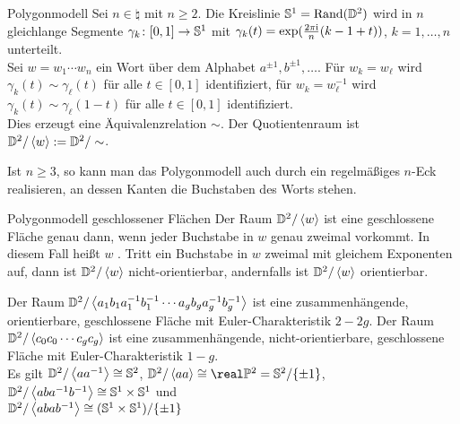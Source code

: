 \linie

\begin{Def}{Polygonmodell}
    Sei $n \in \natural$ mit $n \ge 2$.
    Die Kreislinie $\mathbb{S}^1 = \operatorname{Rand}(\mathbb{D}^2)$ wird in $n$ gleichlange
    Segmente $\gamma_k\colon [0,1] \rightarrow \mathbb{S}^1$ mit
    $\gamma_k(t) = \exp(\frac{2\pi\mathrm{i}}{n} (k - 1 + t))$, $k = 1, \dotsc, n$
    unterteilt. \\
    Sei $w = w_1 \dotsb w_n$ ein Wort über dem Alphabet
    $a^{\pm 1}, b^{\pm 1}, \dotsc$.
    Für $w_k = w_\ell$ wird $\gamma_k(t) \sim \gamma_\ell(t)$ für alle
    $t \in [0, 1]$ identifiziert,
    für $w_k = w_\ell^{-1}$ wird $\gamma_k(t) \sim \gamma_\ell(1 - t)$ für alle
    $t \in [0, 1]$ identifiziert. \\
    Dies erzeugt eine Äquivalenzrelation $\sim$.
    Der Quotientenraum ist
    $\mathbb{D}^2 / \left\langle{w}\right\rangle := \mathbb{D}^2 / \sim$.
\end{Def}

\begin{Bem}
    Ist $n \ge 3$, so kann man das Polygonmodell auch durch ein regelmäßiges
    $n$-Eck realisieren, an dessen Kanten die Buchstaben des Worts stehen.
\end{Bem}

\begin{Satz}{Polygonmodell geschlossener Flächen}
    Der Raum $\mathbb{D}^2 / \left\langle{w}\right\rangle$ ist eine geschlossene Fläche genau dann,
    wenn jeder Buchstabe in $w$ genau zweimal vorkommt.
    In diesem Fall heißt $w$ .
    Tritt ein Buchstabe in $w$ zweimal mit gleichem Exponenten auf,
    dann ist $\mathbb{D}^2 / \left\langle{w}\right\rangle$ nicht-orientierbar,
    andernfalls ist $\mathbb{D}^2 / \left\langle{w}\right\rangle$ orientierbar.
\end{Satz}

\begin{Bsp}
    Der Raum $\mathbb{D}^2 / \left\langle{a_1 b_1 a_1^{-1} b_1^{-1}
    \dotsb a_g b_g a_g^{-1} b_g^{-1}}\right\rangle$ ist eine zusammenhängende,
    orientierbare, geschlossene Fläche mit Euler-Charakteristik $2 - 2g$.
    Der Raum $\mathbb{D}^2 / \left\langle{c_0 c_0 \dotsb c_g c_g}\right\rangle$
    ist eine zusammenhängende,
    nicht-orientierbare, geschlossene Fläche mit
    Euler-Charakteristik $1 - g$. \\
    Es gilt $\mathbb{D}^2 / \left\langle{a a^{-1}}\right\rangle \cong \mathbb{S}^2$, \qquad
    $\dball^2 / \aufspann{a a} \cong \real\projective^2 =
    \sphere^2 / \{\pm 1\}$, \qquad
    $\mathbb{D}^2 / \left\langle{a b a^{-1} b^{-1}}\right\rangle \cong \mathbb{S}^1 \times \mathbb{S}^1$
    und \\
    $\mathbb{D}^2 / \left\langle{a b a b^{-1}}\right\rangle \cong
    (\mathbb{S}^1 \times \mathbb{S}^1) / \{\pm 1\}$
\end{Bsp}

